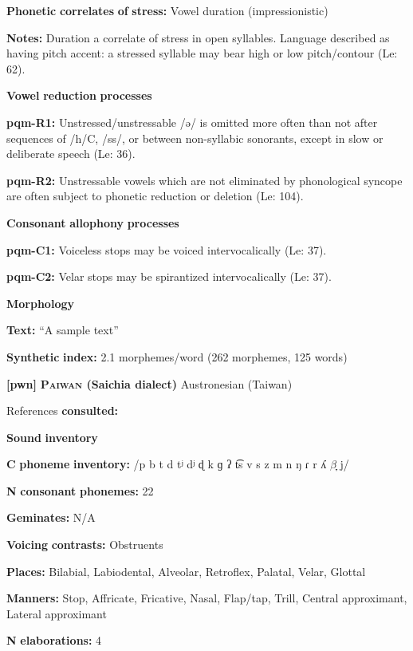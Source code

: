 \begin{styleBody}
\textbf{Phonetic} \textbf{correlates} \textbf{of} \textbf{stress:} Vowel duration (impressionistic)

\textbf{Notes:} Duration a correlate of stress in open syllables. Language described as having pitch accent: a stressed syllable may bear high or low pitch/contour (Le\citealt{Sourd1993}: 62).

\textbf{Vowel} \textbf{reduction} \textbf{processes}

\textbf{pqm-R1:} Unstressed/unstressable /ə/ is omitted more often than not after sequences of /h/C, /ss/, or between non-syllabic sonorants, except in slow or deliberate speech (Le\citealt{Sourd1993}: 36).

\textbf{pqm-R2:} Unstressable vowels which are not eliminated by phonological syncope are often subject to phonetic reduction or deletion (Le\citealt{Sourd1993}: 104).

\textbf{Consonant} \textbf{allophony} \textbf{processes}

\textbf{pqm-C1:} Voiceless stops may be voiced intervocalically (Le\citealt{Sourd1993}: 37).

\textbf{pqm-C2:} Velar stops may be spirantized intervocalically (Le\citealt{Sourd1993}: 37).

\textbf{Morphology}

\textbf{Text:} “A sample text” \citep[55-58]{Leavitt1996}

\textbf{Synthetic} \textbf{index:} 2.1 morphemes/word (262 morphemes, 125 words)

\textbf{[pwn]}   \textbf{\textsc{Paiwan} \textbf{(Saichia} \textbf{dialect)}}  Austronesian (Taiwan)

References \textbf{consulted:} \citet{Chang2006}

\textbf{Sound} \textbf{inventory}

\textbf{C} \textbf{phoneme} \textbf{inventory:} /p b t d tʲ dʲ ɖ k ɡ ʔ t͡s v s z m n ŋ ɾ r ʎ $\beta ̞$ j/

\textbf{N} \textbf{consonant} \textbf{phonemes:} 22

\textbf{Geminates:} N/A

\textbf{Voicing} \textbf{contrasts:} Obstruents

\textbf{Places:} Bilabial, Labiodental, Alveolar, Retroflex, Palatal, Velar, Glottal

\textbf{Manners:} Stop, Affricate, Fricative, Nasal, Flap/tap, Trill, Central approximant, Lateral approximant

\textbf{N} \textbf{elaborations:} 4


\end{styleBody}
